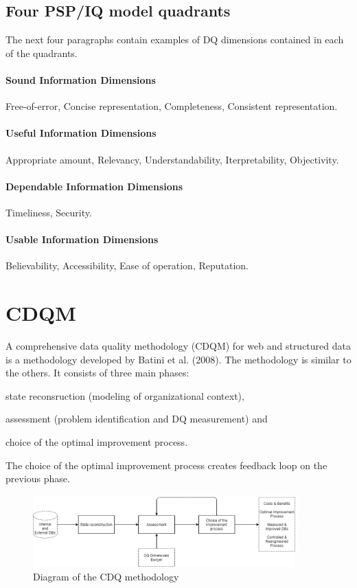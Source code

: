 \subsection{Four PSP/IQ model quadrants}

The next four paragraphs contain examples of DQ dimensions contained in each of the quadrants.

\paragraph*{Sound Information Dimensions} Free-of-error, Concise representation, Completeness, Consistent representation.
\paragraph*{Useful Information Dimensions} Appropriate amount, Relevancy, Understandability, Iterpretability, Objectivity.
\paragraph*{Dependable Information Dimensions} Timeliness, Security.
\paragraph*{Usable Information Dimensions} Believability, Accessibility, Ease of operation, Reputation.

\section{CDQM}

A comprehensive data quality methodology (CDQM) for web and structured data is a methodology developed by Batini et al. (2008).
The methodology is similar to the others.
It consists of three main phases: 
\begin{enumerate*}[label=(\roman*)]
    \item state reconsruction (modeling of organizational context),
    \item assessment (problem identification and DQ measurement) and
    \item choice of the optimal improvement process.
\end{enumerate*}

The choice of the optimal improvement process creates feedback loop on the previous phase.

\begin{figure}[htb]
    \centering
    \includegraphics[width=0.9\textwidth]{figures/cdqm-diagram.png}
    \caption{Diagram of the CDQ methodology~\cite{batini2008}}
    \label{fig:cdqm-diagram}
\end{figure}
\FloatBarrier

